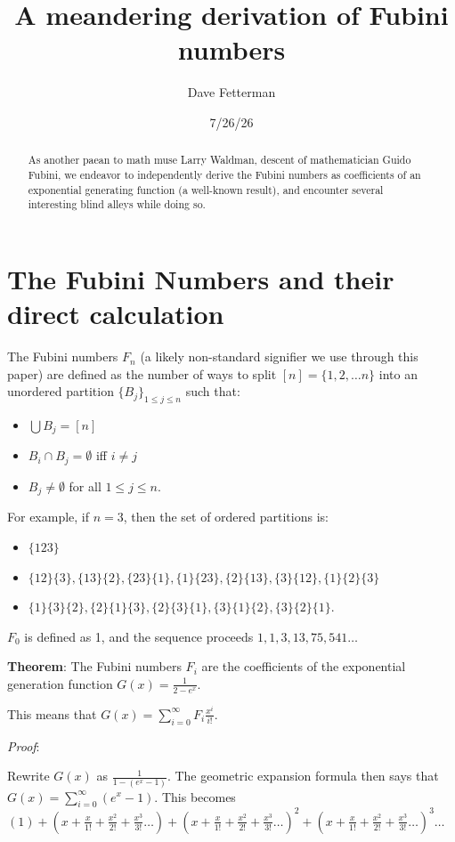 \documentclass[11pt, oneside]{article} 	%
\title{A meandering derivation of Fubini numbers}
\author{Dave Fetterman}
\affil{Surprisingly Employed}
\date{7/26/26}
\begin{document}
\maketitle

\begin{abstract}

As another paean to math muse Larry Waldman, descent of mathematician Guido Fubini, we endeavor to independently derive the Fubini numbers as coefficients of an exponential generating function (a well-known result), and encounter several interesting blind alleys while doing so.
\end{abstract}

\section{The Fubini Numbers and their direct calculation}

The Fubini numbers $F_n$ (a likely non-standard signifier we use through this paper) are defined as the number of ways to split $[n] = \{1, 2, \dots n\}$ into an unordered partition $\{B_j\}_{1 \leq j \leq n}$ such that:
\begin{itemize}
\item $\bigcup B_j = [n]$
\item $B_i \cap B_j = \emptyset$ iff $i \neq j$
\item $B_j \neq \emptyset$ for all $1 \leq j \leq n$.
\end{itemize}

For example, if $n = 3$, then the set of ordered partitions is:
\begin{itemize}
\item $\{123\}$
\item $\{12\}\{3\}, \{13\}\{2\}, \{23\}\{1\}, \{1\}\{23\}, \{2\}\{13\}, \{3\}\{12\}, \{1\}\{2\}\{3\}$
\item $ \{1\}\{3\}\{2\}, \{2\}\{1\}\{3\}, \{2\}\{3\}\{1\}, \{3\}\{1\}\{2\},\{3\}\{2\}\{1\}$.
\end{itemize}

$F_0$ is defined as 1, and the sequence proceeds $1, 1, 3, 13, 75, 541 \ldots$

\textbf{Theorem}: The Fubini numbers $F_i$ are the coefficients of the exponential generation function $G(x) = \frac{1}{2-e^x}$.

This means that $G(x) = \sum_{i=0}^{\infty}F_i \frac{x^i}{i!}$.

\textit{Proof}: 

Rewrite $G(x)$ as $\frac{1}{1-(e^x-1)}$.  The geometric expansion formula then says that $G (x) = \sum_{i=0}^{\infty} (e^x-1)$.
This becomes $(1) + (x + \frac{x}{1!} + \frac{x^2}{2!} + \frac{x^3}{3!} \dots) +  (x + \frac{x}{1!} + \frac{x^2}{2!} + \frac{x^3}{3!} \dots)^2 +   (x + \frac{x}{1!} + \frac{x^2}{2!} + \frac{x^3}{3!} \dots)^3 \dots$ 
\end{document}
